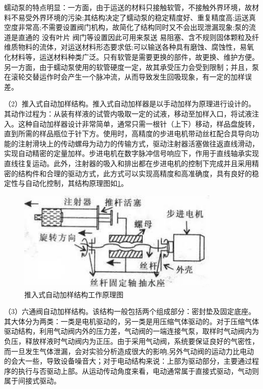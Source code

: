 蠕动泵的特点明显：一方面，由于运送的材料只接触软管，不接触外界环境，故材料不易受外界环境的污染;其结构决定了蠕动泵的稳定精度好、重复精度高;运送真空度非常高;不需要设置阀门机构，故简化了结构同时又不会出现泄漏现象\supercite{bib4};泵的流道是直通的 没有叶片 阀门等设置因此可用来泵送 易阻塞、含不规则固体颗粒及纤维质物料的流体\supercite{bib4}，对运送材料形态要求低;可以输送各种具有磨蚀、腐蚀性，易氧化材料等，运送材料种类广泛。只有软管是需要更换的部件，故更换、维护方便。另一方面，由于蠕动泵使用的软管硬度一定，故其承受压力会受到限制；并且，泵在滚轮交替运作时会产生一个脉冲流，从而导致发生回吸现象，有一定的加样误差。

（2）推入式自动加样结构。推入式自动加样器是以手动加样为原理进行设计的。其动作过程为：从装有样液的试管内吸取一定的试液，移动至加样入口，将试液注入。这种自动加样器设计非常简单，通常只需一根针（上下）移动，样品盘旋转，直到所需的样品瓶位于针下方。使用时，高精度的步进电机带动丝杠配合具导向功能的注射滑块上的传动螺母为动力的传输方式，驱动注射器活塞做往返直线滑动，实现自动精密的定量加样。步进电机在数字脉冲信号响应下，作用于直线轴承实现直线往复运动\supercite{bib5}。此外，注射器的吸入和排出都在步进电机的控制下完成并且采用精密的结构件和合理的驱动方式，此方式可以实现高精度和高准确度，具有良好的稳定性与自动化控制，其结构原理图如\ref{fig:2-2}。

\begin{figure}[htbp!]
  \centering
  \includegraphics[height=4.8cm]{chap/figure/2-2.jpg}
  \caption{推入式自动加样结构工作原理图}
  \label{fig:2-2}
\end{figure}

（3）六通阀自动加样结构。该结构一般包括两个组成部分：密封垫及固定底座。其大体分为两类：一类是电机驱动的，另一类是用压缩气体驱动的。对于压缩气体驱动结构，利用气动阀内外的压力差，气动阀的一端连接气泵，取样时气动阀内为负压，释放样液时气动阀内为正压。由于采用气动阀，系统要保证良好的气密性，而一旦发生气体泄漏，会对实验分析造成很大的影响,另外气动阀的运动力比电动的会大一些，导致设备噪音大；对于电动结构来说：上部为驱动部分，主要通过程序的执行与否驱动上部。从运动传动角度来看，电动通常属于直接式驱动，气动则属于间接式驱动。

